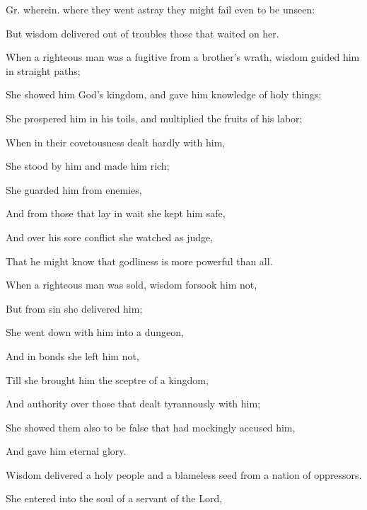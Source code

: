 {{Gr.
wherein.
} where they
 went astray they might fail even to be unseen:
\par }{\Q {}But wisdom delivered out of troubles those that waited on her.
\par }{\BB \par }{\Q {}When a righteous man was a fugitive from a brother’s wrath,
 wisdom guided him in straight paths;
\par }{\QB She showed him God’s kingdom, and gave him knowledge of holy things;
\par }{\QB She prospered him in his toils, and multiplied the fruits of his labor;
\par }{\Q {}When in their covetousness
{} dealt hardly with him,
\par }{\QB She stood by him and made him rich;
\par }{\Q {}She guarded him from enemies,
\par }{\QB And from those that lay in wait she kept him safe,
\par }{\QB And over his sore conflict she watched as judge,
\par }{\QB That he might know that godliness is more powerful than
 all.
\par }{\BB \par }{\Q {}When a righteous man was sold,
 wisdom forsook him not,
\par }{\QB But
 from sin she delivered him;
\par }{\QB She went down with him into a dungeon,
\par }{\Q {}And in bonds she left him not,
\par }{\QB Till she brought him the sceptre of a kingdom,
\par }{\QB And authority over those that dealt tyrannously with him;
\par }{\QB She showed them also to be false that had mockingly accused him,
\par }{\QB And gave him eternal glory.
\par }{\BB \par }{\Q {} Wisdom delivered a holy people and a blameless seed from a nation of oppressors.
\par }{\Q {}She entered into the soul of a servant of the Lord,
}
